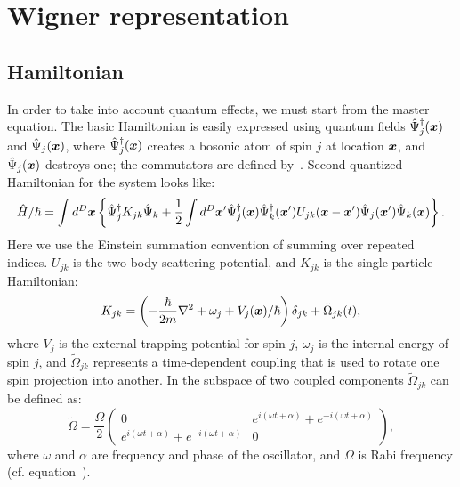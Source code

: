 \chapter{Wigner representation}
\label{cha:wigner}


\section{Hamiltonian}

In order to take into account quantum effects, we must start from the master equation.
The basic Hamiltonian is easily expressed using quantum fields $\hat{\Psi}_j^{\dagger}(\boldsymbol{x})$ and $\hat{\Psi}_j(\boldsymbol{x})$,
where $\hat{\Psi}_j^{\dagger}(\boldsymbol{x})$ creates a bosonic atom of spin $j$ at location $\boldsymbol{x}$,
and $\hat{\Psi}_j(\boldsymbol{x})$ destroys one;
the commutators are defined by~.
Second-quantized Hamiltonian for the system looks like:
\begin{equation}
\label{eqn:wigner:hamiltonian}
\begin{split}
	\hat{H} / \hbar = \int d^{D}\boldsymbol{x} \left\{
		\hat{\Psi}_j^{\dagger} K_{jk} \hat{\Psi}_k
		+ \frac{1}{2} \int d^D\boldsymbol{x}^\prime
			\hat{\Psi}_j^\dagger (\boldsymbol{x}) \hat{\Psi}_k^\dagger (\boldsymbol{x}^\prime)
			U_{jk}(\boldsymbol{x} - \boldsymbol{x}^\prime)
			\hat{\Psi}_j (\boldsymbol{x}^\prime) \hat{\Psi}_k (\boldsymbol{x})
	\right\}.
\end{split}
\end{equation}
Here we use the Einstein summation convention of summing over repeated indices.
$U_{jk}$ is the two-body scattering potential, and $K_{jk}$ is the single-particle Hamiltonian:
\begin{equation}
	K_{jk} = \left(
			-\frac{\hbar}{2m} \nabla^2 + \omega_j + V_j(\boldsymbol{x}) / \hbar
		\right) \delta_{jk}
		+ \tilde{\Omega}_{jk}(t),
\end{equation}
where $V_j$ is the external trapping potential for spin $j$,
$\omega_j$ is the internal energy of spin $j$,
and $\tilde{\Omega}_{jk}$ represents a time-dependent coupling that is used to rotate one spin projection into another.
In the subspace of two coupled components $\tilde{\Omega}_{jk}$ can be defined as:
\[
	\tilde{\Omega} = \frac{\Omega}{2} \begin{pmatrix}
		0 & e^{i(\omega t + \alpha)} + e^{-i(\omega t + \alpha)} \\
		e^{i (\omega t + \alpha)} + e^{-i(\omega t + \alpha)} & 0
	\end{pmatrix},
\]
where $\omega$ and $\alpha$ are frequency and phase of the oscillator,
and $\Omega$ is Rabi frequency (cf. equation~).

